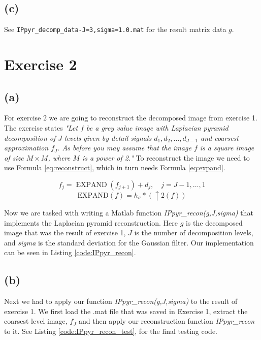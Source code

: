 \documentclass{article}
\begin{document}
\subsection*{(c)} See \texttt{IPpyr\_decomp\_data-J=3,sigma=1.0.mat} for the result matrix data $g$.

\newpage
\section*{Exercise 2}
\subsection*{(a)}
For exercise 2 we are going to reconstruct the decomposed image from exercise 1. The exercise states \textit{"Let $f$ be a grey value image with Laplacian pyramid decomposition of $J$ levels given by detail signals $d_1, d_2, \ldots, d_{J - 1}$ and coarsest approximation $f_J$. As before you may assume that the image $f$ is a square image of size $M \times M$, where $M$ is a power of 2."} To reconstruct the image we need to use Formula \ref{eq:reconstruct}, which in turn needs Formula \ref{eq:expand}.

\begin{equation}\label{eq:reconstruct}
    f_{j}=\operatorname{EXPAND}\left(f_{j+1}\right)+d_j, \quad j=J-1, \ldots, 1
\end{equation}
\begin{equation}\label{eq:expand}
    \mathrm{EXPAND}(f)=h_{\sigma} *(\uparrow 2(f))
\end{equation}

Now we are tasked with writing a Matlab function \textit{IPpyr\_recon(g,J,sigma)} that implements the Laplacian pyramid reconstruction. Here $g$ is the decomposed image that was the result of exercise 1, $J$ is the number of decomposition levels, and \textit{sigma} is the standard deviation for the Gaussian filter. Our implementation can be seen in  Listing \ref{code:IPpyr_recon}.

\subsection*{(b)}
Next we had to apply our function \textit{IPpyr\_recon(g,J,sigma)} to the result of exercise 1. We first load the .mat file that was saved in Exercise 1, extract the coarsest level image, $f_J$ and then apply our reconstruction function \textit{IPpyr\_recon} to it. See  Listing \ref{code:IPpyr_recon_test}, for the final testing code.
\end{document}
